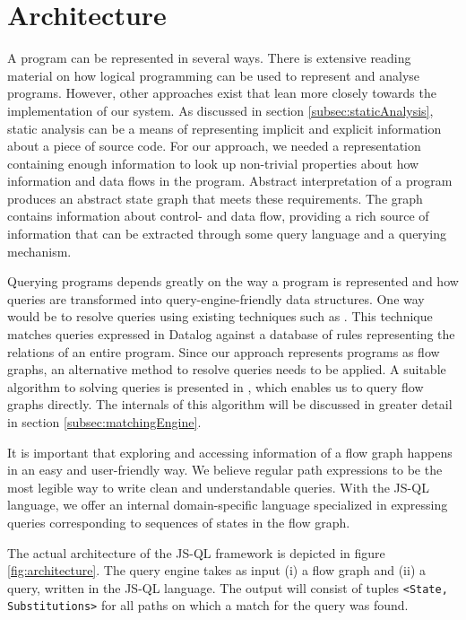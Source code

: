 \section{Architecture}

A program can be represented in several ways. There is extensive reading material on how logical programming can be used to represent and analyse programs\cite{Reps1995}\cite{DatalogDBQueries}. However, other approaches exist that lean more closely towards the implementation of our system.  As discussed in section \ref{subsec:staticAnalysis}, static analysis can be a means of representing implicit and explicit information about a piece of source code. For our approach, we needed a representation containing enough information to look up non-trivial properties about how information and data flows in the program. Abstract interpretation of a program produces an abstract state graph that meets these requirements. The graph contains information about control- and data flow, providing a rich source of information that can be extracted through some query language and a querying mechanism. 

Querying programs depends greatly on the way a program is represented and how queries are transformed into query-engine-friendly data structures. One way would be to resolve queries using existing techniques such as \cite{bddbddb}. This technique matches queries expressed in Datalog against a database of rules representing the relations of an entire program. Since our approach represents programs as flow graphs, an alternative method to resolve queries needs to be applied. A suitable algorithm to solving queries is presented in \cite{algoEngine}, which enables us to query flow graphs directly. The internals of this algorithm will be discussed in greater detail in section \ref{subsec:matchingEngine}.

It is important that exploring and accessing information of a flow graph happens in an easy and user-friendly way. We believe regular path expressions to be the most legible way to write clean and understandable queries. With the JS-QL language, we offer an internal domain-specific language specialized in expressing queries corresponding to sequences of states in the flow graph. 

The actual architecture of the JS-QL framework is depicted in figure \ref{fig:architecture}. The query engine takes as input (i) a flow graph and (ii) a query, written in the JS-QL language. The output will consist of tuples \texttt{<State, Substitutions>} for all paths on which a match for the query was found.

